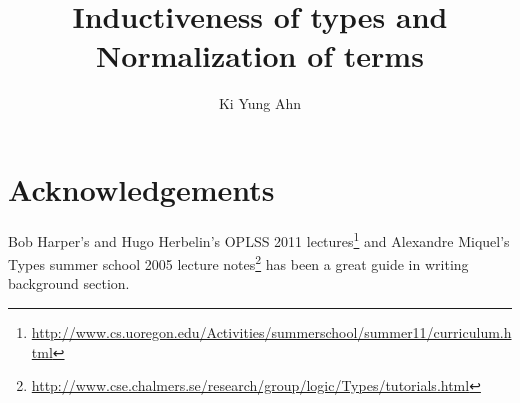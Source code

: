 \documentclass[letterpaper,12pt]{article}
\begin{document}
\title{Inductiveness of types and Normalization of terms}
\author{Ki Yung Ahn}
\maketitle









\section*{Acknowledgements}
Bob Harper's and Hugo Herbelin's OPLSS 2011 lectures\footnote{
\url{http://www.cs.uoregon.edu/Activities/summerschool/summer11/curriculum.html}
} and
Alexandre Miquel's Types summer school 2005 lecture notes\footnote{
\url{http://www.cse.chalmers.se/research/group/logic/Types/tutorials.html}
} has been a great guide in writing background section.



\end{document}
